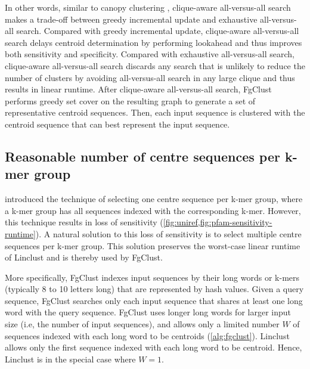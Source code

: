 \documentclass{bioinfo}
\begin{document}

In other words, similar to canopy clustering \citep{mccallum2000efficient}, clique-aware all-versus-all search makes a trade-off between greedy incremental update and exhaustive all-versus-all search. 
Compared with greedy incremental update, clique-aware all-versus-all search delays centroid determination by performing lookahead and thus improves both sensitivity and specificity.
Compared with exhaustive all-versus-all search, clique-aware all-versus-all search discards any search that is unlikely to reduce the number of clusters by avoiding all-versus-all search in any large clique and thus results in linear runtime.
After clique-aware all-versus-all search, FgClust performs greedy set cover on the resulting graph to generate a set of representative centroid sequences.
Then, each input sequence is clustered with the centroid sequence that can best represent the input sequence.


\subsection{Reasonable number of centre sequences per k-mer group}
\label{subsec:linclust-like}

 introduced the technique of selecting one centre sequence per k-mer group, where a k-mer group has all sequences indexed with the corresponding k-mer. However, this technique results in loss of sensitivity (\cref{fig:uniref,fig:pfam-sensitivity-runtime}). A natural solution to this loss of sensitivity is to select multiple centre sequences per k-mer group. This solution preserves the worst-case linear runtime of Linclust and is thereby used by FgClust.

More specifically, FgClust indexes input sequences by their long words or k-mers (typically 8 to 10 letters long) that are represented by hash values.
%
Given a query sequence, FgClust searches only each input sequence that shares at least one long word with the query sequence. 
FgClust uses longer long words for larger input size (i.e, the number of input sequences), and allows only a limited number \(W\) of sequences indexed with each long word to be centroids (\cref{alg:fgclust}).
Linclust allows only the first sequence indexed with each long word to be centroid.
Hence, Linclust is in the special case where \(W=1\).
\end{document}
